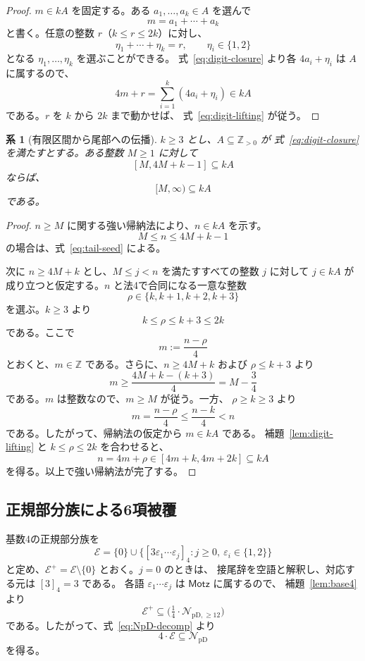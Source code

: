 \documentclass[12pt]{ltjsarticle}
\theoremstyle{plain}
\newtheorem{corollary}[theorem]{系}
\theoremstyle{definition}
\theoremstyle{plain}
\newcommand{\NpD}{\mathcal{N}_{\mathrm{pD}}}
\newcommand{\Pset}{%
  \bigl(\tfrac{1}{4}\cdot\mathcal{N}_{\mathrm{pD},\geq 12}\bigr)%
}
\begin{document}
\begin{proof}
$m\in kA$ を固定する。ある $a_1,\ldots,a_k\in A$ を選んで
\[
 m=a_1+\cdots+a_k
\]
と書く。任意の整数 $r$（$k\leq r\leq2k$）に対し、
\[
 \eta_1+\cdots+\eta_k=r,
 \qquad \eta_i\in\{1,2\}
\]
となる $\eta_1,\ldots,\eta_k$ を選ぶことができる。
式~\eqref{eq:digit-closure} より各 $4a_i+\eta_i$ は $A$ に属するので、
\[
 4m+r
 =\sum_{i=1}^{k}(4a_i+\eta_i)
 \in kA
\]
である。$r$ を $k$ から $2k$ まで動かせば、
式~\eqref{eq:digit-lifting} が従う。
\end{proof}

\begin{corollary}[有限区間から尾部への伝播]
\label{cor:tail-propagation}
$k\geq3$ とし、$A\subseteq\mathbb Z_{>0}$ が
式~\eqref{eq:digit-closure} を満たすとする。ある整数 $M\geq1$ に対して
\begin{equation}\label{eq:tail-seed}
 [M,4M+k-1]\subseteq kA
\end{equation}
ならば、
\[
 [M,\infty)\subseteq kA
\]
である。
\end{corollary}

\begin{proof}
$n\geq M$ に関する強い帰納法により、$n\in kA$ を示す。
\[
 M\leq n\leq4M+k-1
\]
の場合は、式~\eqref{eq:tail-seed} による。

次に $n\geq4M+k$ とし、$M\leq j<n$ を満たすすべての整数 $j$ に対して
$j\in kA$ が成り立つと仮定する。$n$ と法4で合同になる一意な整数
\[
 \rho\in\{k,k+1,k+2,k+3\}
\]
を選ぶ。$k\geq3$ より
\[
 k\leq\rho\leq k+3\leq2k
\]
である。ここで
\[
 m:=\frac{n-\rho}{4}
\]
とおくと、$m\in\mathbb Z$ である。さらに、$n\geq4M+k$ および
$\rho\leq k+3$ より
\[
 m\geq\frac{4M+k-(k+3)}4=M-\frac34
\]
である。$m$ は整数なので、$m\geq M$ が従う。一方、
$\rho\geq k\geq3$ より
\[
 m=\frac{n-\rho}{4}
 \leq\frac{n-k}{4}
 <n
\]
である。したがって、帰納法の仮定から $m\in kA$ である。
補題~\ref{lem:digit-lifting} と $k\leq\rho\leq2k$ を合わせると、
\[
 n=4m+\rho
 \in[4m+k,4m+2k]
 \subseteq kA
\]
を得る。以上で強い帰納法が完了する。
\end{proof}

\subsection{正規部分族による6項被覆}

基数4の正規部分族を
\[
 \mathcal E=\{0\}\cup
 \bigl\{[3\varepsilon_1\cdots\varepsilon_j]_4:
        j\geq0,\ \varepsilon_i\in\{1,2\}\bigr\}
\]
と定め、$\mathcal E^+=\mathcal E\setminus\{0\}$ とおく。$j=0$ のときは、
接尾辞を空語と解釈し、対応する元は $[3]_4=3$ である。
各語 $\varepsilon_1\cdots\varepsilon_j$ は $\mathsf{Motz}$ に属するので、
補題~\ref{lem:base4} より
\[
 \mathcal E^+\subseteq\Pset
\]
である。したがって、式~\eqref{eq:NpD-decomp} より
\begin{equation}\label{eq:4E}
 4\cdot\mathcal E\subseteq\NpD
\end{equation}
を得る。
\end{document}

